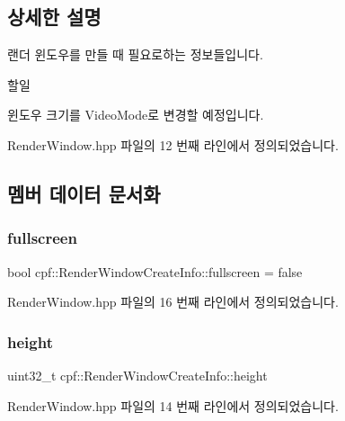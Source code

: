 \subsection{상세한 설명}
랜더 윈도우를 만들 때 필요로하는 정보들입니다. \begin{DoxyRefDesc}{할일}
\item[\hyperlink{todo__todo000001}{할일}]윈도우 크기를 Video\+Mode로 변경할 예정입니다. \end{DoxyRefDesc}


Render\+Window.\+hpp 파일의 12 번째 라인에서 정의되었습니다.



\subsection{멤버 데이터 문서화}
\mbox{\label{structcpf_1_1_render_window_create_info_a72ea6911da5c022c63670045041b86c3}} 
\subsubsection{\texorpdfstring{fullscreen}{fullscreen}}
{\footnotesize\ttfamily bool cpf\+::\+Render\+Window\+Create\+Info\+::fullscreen = false}



Render\+Window.\+hpp 파일의 16 번째 라인에서 정의되었습니다.

\mbox{\label{structcpf_1_1_render_window_create_info_a6af4056c0776858a053126de8c2b9011}} 
\subsubsection{\texorpdfstring{height}{height}}
{\footnotesize\ttfamily uint32\+\_\+t cpf\+::\+Render\+Window\+Create\+Info\+::height}



Render\+Window.\+hpp 파일의 14 번째 라인에서 정의되었습니다.

